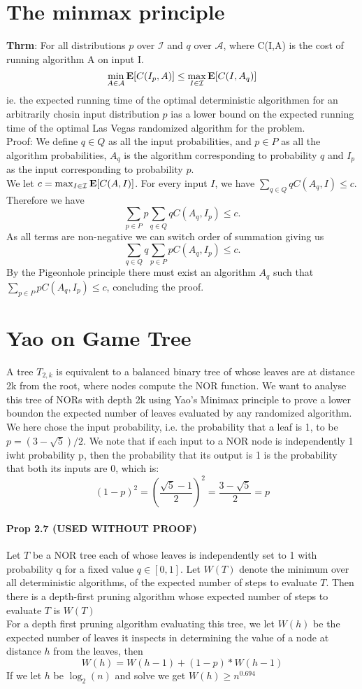 \documentclass[a4paper]{article}
\def\A{\mathcal{A}}
\def\I{\mathcal{I}}
\def\E{\mathbb{E}}
\def\E{\mbox{\textbf{E}}}
\begin{document}
\section{The minmax principle}
\textbf{Thrm}:
For all distributions $p$ over $\I$ and $q$ over $\A$, where C(I,A) is the cost of running algorithm A on input I.
$$
\min_{A \in \A} \E[C(I_p, A)] \leq \max_{I\in\I} \E[C(I,A_q)]
$$
ie. the expected running time of the optimal deterministic algorithmen for an arbitrarily chosin input distribution $p$ ias a lower bound on the expected running time of the optimal Las Vegas randomized algorithm for the problem.\\
Proof:
We define $q \in Q$ as all the input probabilities, and $p\in P$ as all the algorithm probabilities, $A_q$ is the algorithm corresponding to probability $q$ and $I_p$ as the input corresponding to probability $p$.\\
We let $c = \max_{I\in\I} \E[C(A,I)]$. For every input $I$, we have $\sum_{q \in Q} q C(A_q,I) \leq c$. Therefore we have
$$\sum_{p \in P} p \sum_{q \in Q} q C(A_q,I_p) \leq c.$$
As all terms are non-negative we can switch order of summation giving us
$$\sum_{q \in Q} q \sum_{p \in P} p C(A_q,I_p) \leq c.$$
By the Pigeonhole principle there must exist an algorithm $A_q$ such that $\sum_{p \in P} p C(A_q,I_p) \leq c$, concluding the proof.

\section{Yao on Game Tree}
A tree $T_{2,k}$ is equivalent to a balanced binary tree of whose leaves are at distance 2k from the root, where nodes compute the NOR function.
We want to analyse this tree of NORs with depth 2k using Yao's Minimax principle to prove a lower boundon the expected number of leaves evaluated by any randomized algorithm.
We here chose the input probability, i.e. the probability that a leaf is 1, to be $p = (3 - \sqrt{5})/2$. We note that if each input to a NOR node is independently 1 iwht probability p, then the probability that its output is 1 is the probability that both its inputs are 0, which is:
$$
(1 - p)^2 = \left(\frac{\sqrt 5 - 1}{2} \right)^2 = \frac{3-\sqrt{5}}{2} = p
$$
\paragraph{Prop 2.7 (USED WITHOUT PROOF)} Let $T$ be a NOR tree each of whose leaves is independently set to 1 with probability q for a fixed value $q \in [0,1]$. Let $W(T)$ denote the minimum over all deterministic algorithms, of the expected number of steps to evaluate $T$. Then there is a depth-first pruning algorithm whose expected number of steps to evaluate $T$ is $W(T)$\\
For a depth first pruning algorithm evaluating this tree, we let $W(h)$ be the expected number of leaves it inspects in determining the value of a node at distance $h$ from the leaves, then
$$
W(h) = W(h-1) + (1-p) * W(h-1)
$$
If we let $h$ be $\log_2(n)$ and solve we get $W(h) \geq n^{0.694}$
\end{document}
